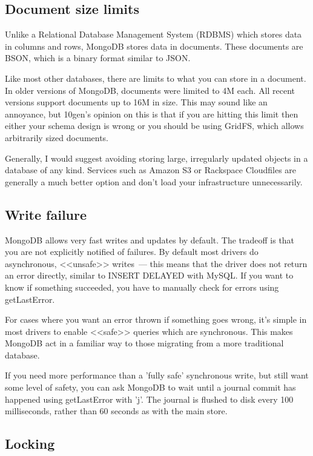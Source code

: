 \subsection{Document size limits}

Unlike a Relational Database Management System (RDBMS) which stores data in columns and rows, MongoDB stores data in documents. These documents are BSON, which is a binary format similar to JSON.

Like most other databases, there are limits to what you can store in a document. In older versions of MongoDB, documents were limited to 4M each. All recent versions support documents up to 16M in size. This may sound like an annoyance, but 10gen's opinion on this is that if you are hitting this limit then either your schema design is wrong or you should be using GridFS, which allows arbitrarily sized documents.

Generally, I would suggest avoiding storing large, irregularly updated objects in a database of any kind. Services such as Amazon S3 or Rackspace Cloudfiles are generally a much better option and don't load your infrastructure unnecessarily.

\subsection{Write failure}

MongoDB allows very fast writes and updates by default. The tradeoff is that you are not explicitly notified of failures. By default most drivers do asynchronous, <<unsafe>> writes~--- this means that the driver does not return an error directly, similar to INSERT DELAYED with MySQL. If you want to know if something succeeded, you have to manually check for errors using getLastError.

For cases where you want an error thrown if something goes wrong, it's simple in most drivers to enable <<safe>> queries which are synchronous. This makes MongoDB act in a familiar way to those migrating from a more traditional database.

If you need more performance than a 'fully safe' synchronous write, but still want some level of safety, you can ask MongoDB to wait until a journal commit has happened using getLastError with 'j'. The journal is flushed to disk every 100 milliseconds, rather than 60 seconds as with the main store.

\subsection{Locking}

